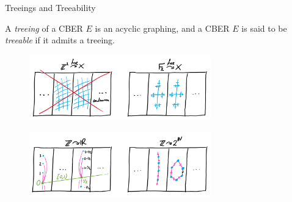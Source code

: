\documentclass{beamer}
\begin{document}
    \begin{frame}{Treeings and Treeability}
        \begin{definition}
            A \textit{treeing} of a CBER $E$ is an acyclic graphing, and a CBER $E$ is said to be \textit{treeable} if it admits a treeing.
        \end{definition}

        \vspace{-0.14in}

        \begin{figure}[h]
            \center
            \includegraphics[width=0.7\textwidth]{img/not_treeable.png}
        \end{figure}
        \vspace{-0.2in}
        \begin{figure}[h]
            \center
            \includegraphics[width=0.7\textwidth]{img/smooth_hyperfinite.png}
        \end{figure}
    \end{frame}
\end{document}
